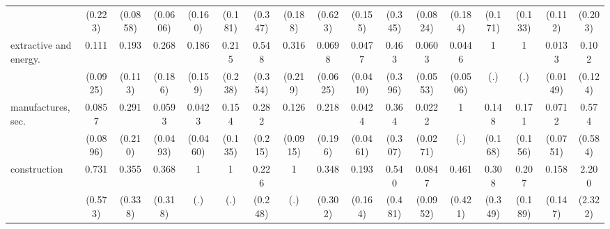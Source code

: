 {\begin{tabular}{l*{16}{c}}
                    &     (0.223)         &    (0.0858)         &    (0.0606)         &     (0.160)         &     (0.181)         &     (0.347)         &     (0.188)         &     (0.623)         &     (0.155)         &     (0.345)         &    (0.0824)         &     (0.184)         &     (0.171)         &     (0.133)         &     (0.112)         &     (0.203)         \\
[1em]
extractive and energy.&       0.111\sym{**} &       0.193\sym{**} &       0.268         &       0.186\sym{*}  &       0.215         &       0.548         &       0.316         &      0.0698\sym{**} &      0.0477\sym{***}&       0.463         &      0.0603\sym{**} &      0.0446\sym{**} &           1         &           1         &      0.0133\sym{***}&       0.102         \\
                    &    (0.0925)         &     (0.113)         &     (0.186)         &     (0.159)         &     (0.238)         &     (0.354)         &     (0.219)         &    (0.0625)         &    (0.0410)         &     (0.396)         &    (0.0553)         &    (0.0506)         &         (.)         &         (.)         &    (0.0149)         &     (0.124)         \\
[1em]
manufactures, sec.  &      0.0857\sym{*}  &       0.291         &      0.0593\sym{***}&      0.0423\sym{**} &       0.154\sym{*}  &       0.282         &       0.126\sym{**} &       0.218         &      0.0424\sym{**} &       0.364         &      0.0222\sym{**} &           1         &       0.148         &       0.171         &      0.0712\sym{*}  &       0.574         \\
                    &    (0.0896)         &     (0.210)         &    (0.0493)         &    (0.0460)         &     (0.135)         &     (0.215)         &    (0.0915)         &     (0.196)         &    (0.0461)         &     (0.307)         &    (0.0271)         &         (.)         &     (0.168)         &     (0.156)         &    (0.0751)         &     (0.584)         \\
[1em]
construction        &       0.731         &       0.355         &       0.368         &           1         &           1         &       0.226         &           1         &       0.348         &       0.193         &       0.540         &      0.0847\sym{*}  &       0.461         &       0.308         &       0.207         &       0.158\sym{*}  &       2.200         \\
                    &     (0.573)         &     (0.338)         &     (0.318)         &         (.)         &         (.)         &     (0.248)         &         (.)         &     (0.302)         &     (0.164)         &     (0.481)         &    (0.0952)         &     (0.421)         &     (0.349)         &     (0.189)         &     (0.147)         &     (2.322)         \\

\end{tabular}}
